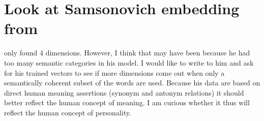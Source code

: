 \documentclass[eric_thesis.tex]{subfiles}
\begin{document}
\section{Look at Samsonovich embedding from }

\citep{Samsonovich2010} only found 4 dimensions. However, I think that may have been 
because he had too many semantic categories in his model. I would like to
write to him and ask for his trained vectors to see if more dimensions come out
when only a semantically coherent subset of the words are used. Because his
data are based on direct human meaning assertions (synonym and antonym 
relations) it should better reflect the human concept of meaning. I am 
curious whether it thus will reflect the human concept of personality.
\end{document}

